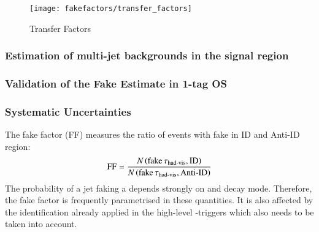 \begin{figure}[htbp]
  \centering

  \texttt{[image: fakefactors/transfer\_factors]}

  \caption{Transfer Factors}
  \label{fig:mjfakes_transfer_factor}
\end{figure}


\subsubsection{Estimation of multi-jet backgrounds in the signal region}


\subsubsection{Validation of the Fake Estimate in 1-tag OS}

\subsubsection{Systematic Uncertainties}









The fake factor (FF) measures the ratio of events with fake \tauhadvis in ID and
Anti-ID region:
\begin{align*}
  \text{FF} = \frac{N\left( \text{fake} \, \tau_{\text{had-vis}}, \text{ID} \right)}{N\left( \text{fake} \, \tau_{\text{had-vis}}, \text{Anti-ID} \right)}
\end{align*}
The probability of a jet faking a \tauhadvis depends strongly on \tauhadvis \pT
and decay mode. Therefore, the fake factor is frequently parametrised in these
quantities. It is also affected by the \tauhadvis identification already applied
in the high-level \tauhadvis-triggers which also needs to be taken into account.

